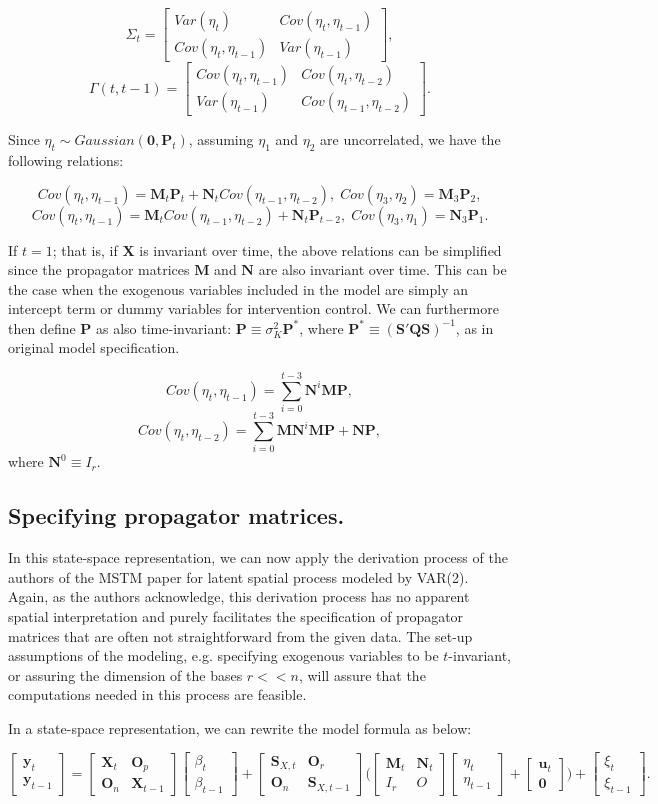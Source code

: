 \documentclass[12pt]{article}
\newcommand{\myvec}[2]{
\left[\begin{array}{c}
#1 \\ #2
\end{array}\right]
}
\newcommand{\mymat}[4]{
\left[\begin{array}{cc}
#1 & #2 \\ #3 & #4
\end{array}\right]
}
\begin{document}
$$\Sigma_t = \mymat{Var(\eta_t)}{Cov(\eta_t,\eta_{t-1})}{Cov(\eta_{t},\eta_{t-1})}{Var(\eta_{t-1})},$$
$$\Gamma(t,t-1) = \mymat{Cov(\eta_t,\eta_{t-1})}{Cov(\eta_t,\eta_{t-2})}{Var(\eta_{t-1})}{Cov(\eta_{t-1},\eta_{t-2})}.$$

Since $\eta_t\sim Gaussian(\mathbf{0}, \mathbf{P}_t)$, assuming $\eta_1$ and $\eta_2$ are uncorrelated, we have the following relations:

$$Cov(\eta_t,\eta_{t-1}) = \mathbf{M}_t\mathbf{P}_t + \mathbf{N}_t Cov(\eta_{t-1},\eta_{t-2}),\; Cov(\eta_3,\eta_2)=\mathbf{M}_3\mathbf{P}_2,$$
$$Cov(\eta_t,\eta_{t-1}) = \mathbf{M}_t Cov(\eta_{t-1},\eta_{t-2}) + \mathbf{N}_t\mathbf{P}_{t-2},\; Cov(\eta_3,\eta_1)=\mathbf{N}_3\mathbf{P}_1.$$

If $t=1$; that is, if $\mathbf{X}$ is invariant over time, the above relations can be simplified since the propagator matrices $\mathbf{M}$ and $\mathbf{N}$ are also invariant over time. This can be the case when the exogenous variables included in the model are simply an intercept term or dummy variables for intervention control. We can furthermore then define $\mathbf{P}$ as also time-invariant: $\mathbf{P}\equiv \sigma^2_K\mathbf{P}^*$, where $\mathbf{P}^*\equiv (\mathbf{S'QS})^{-1}$, as in original model specification.

$$Cov(\eta_t,\eta_{t-1}) = \sum_{i=0}^{t-3} \mathbf{N}^i\mathbf{M}\mathbf{P},$$
$$Cov(\eta_t,\eta_{t-2}) = \sum_{i=0}^{t-3} \mathbf{M}\mathbf{N}^i\mathbf{M}\mathbf{P} + \mathbf{NP},$$
where $\mathbf{N}^0\equiv I_r$.

\subsection*{Specifying propagator matrices.}
In this state-space representation, we can now apply the derivation process of the authors of the MSTM paper for latent spatial process modeled by VAR(2). Again, as the authors acknowledge, this derivation process has no apparent spatial interpretation and purely facilitates the specification of propagator matrices that are often not straightforward from the given data. The set-up assumptions of the modeling, e.g. specifying exogenous variables to be $t$-invariant, or assuring the dimension of the bases $r << n$, will assure that the computations needed in this process are feasible. 

In a state-space representation, we can rewrite the model formula as below:

$$
\myvec{\mathbf{y}_t}{\mathbf{y}_{t-1}} = 
\mymat{\mathbf{X}_t}{\mathbf{O}_p}{\mathbf{O}_n}{\mathbf{X}_{t-1}} \myvec{\beta_t}{\beta_{t-1}} +
\mymat{\mathbf{S}_{X,t}}{\mathbf{O}_r}{\mathbf{O}_n}{\mathbf{S}_{X,t-1}}
\bigg(\mymat{\mathbf{M}_t}{\mathbf{N}_t}{I_r}{O}
\myvec{\eta_t}{\eta_{t-1}} + \myvec{\mathbf{u}_t}{\mathbf{0}}
\bigg) +
\myvec{\xi_t}{\xi_{t-1}}.
$$
\end{document}
